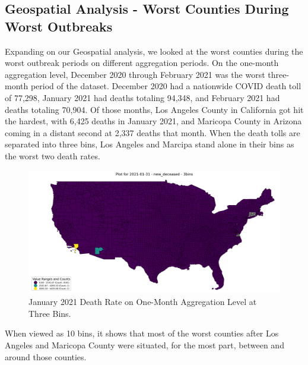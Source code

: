 \documentclass[sigconf,screen,nonacm]{acmart}
\begin{document}
\noindent
\subsection{Geospatial Analysis - Worst Counties During Worst Outbreaks}
Expanding on our Geospatial analysis, we looked at the worst counties during the worst outbreak periods on different aggregation periods. On the one-month aggregation level, December 2020 through February 2021 was the worst three-month period of the dataset. December 2020 had a nationwide COVID death toll of 77,298, January 2021 had deaths totaling 94,348, and February 2021 had deaths totaling 70,904. Of those months, Los Angeles County in California got hit the hardest, with 6,425 deaths in January 2021, and Maricopa County in Arizona coming in a distant second at 2,337 deaths that month. When the death tolls are separated into three bins, Los Angeles and Marcipa stand alone in their bins as the worst two death rates.

\begin{figure}[h]
  \centering
  \includegraphics[width=1\linewidth]{Figures/Plot for Month Ending 2021-01-31 - new_deceased - 3bins.png}
  \caption{January 2021 Death Rate on One-Month Aggregation Level at Three Bins.}
\end{figure}

When viewed as 10 bins, it shows that most of the worst counties after Los Angeles and Maricopa County were situated, for the most part, between and around those counties.
\end{document}
